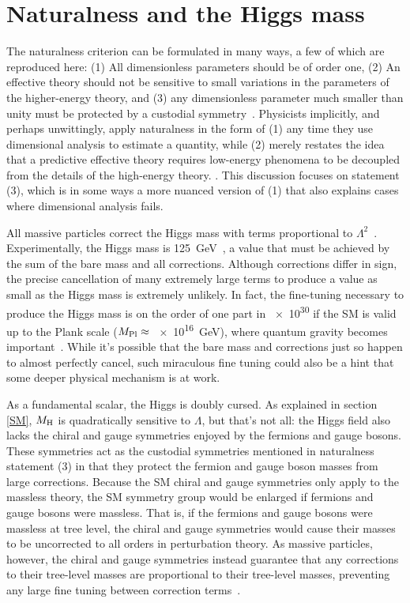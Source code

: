 \documentclass[12pt]{article}
\begin{document}
\section{Naturalness and the Higgs mass}
    The naturalness criterion can be formulated in many ways, a few of which are reproduced here: (1) All dimensionless parameters should be of order one, (2) An effective theory should not be sensitive to small variations in the parameters of the higher-energy theory, and (3) any dimensionless parameter much smaller than unity must be protected by a custodial symmetry~\cite{giudice_naturally, thooft_naturalness}. Physicists implicitly, and perhaps unwittingly, apply naturalness in the form of (1) any time they use dimensional analysis to estimate a quantity, while (2) merely restates the idea that a predictive effective theory requires low-energy phenomena to be decoupled from the details of the high-energy theory. . This discussion focuses on statement (3), which is in some ways a more nuanced version of (1) that also explains cases where dimensional analysis fails.

    All massive particles correct the Higgs mass with terms proportional to $\Lambda^2$~\cite{dine_naturalness}. Experimentally, the Higgs mass is \SI{125}{\giga\electronvolt}~\cite{cms_higgs, atlas_higgs}, a value that must be achieved by the sum of the bare mass and all corrections. Although corrections differ in sign, the precise cancellation of many extremely large terms to produce a value as small as the Higgs mass is extremely unlikely. In fact, the fine-tuning necessary to produce the Higgs mass is on the order of one part in \num{e30} if the SM is valid up to the Plank scale ($M_{\mathrm{Pl}}\approx$ \SI{e16}{\giga\electronvolt}), where quantum gravity becomes important~\cite{giudice_naturally}. While it's possible that the bare mass and corrections just so happen to almost perfectly cancel, such miraculous fine tuning could also be a hint that some deeper physical mechanism is at work.
    
    As a fundamental scalar, the Higgs is doubly cursed. As explained in section \ref{SM}, $M_{\mathrm{H}}$ is quadratically sensitive to $\Lambda$, but that's not all: the Higgs field also lacks the chiral and gauge symmetries enjoyed by the fermions and gauge bosons. These symmetries act as the custodial symmetries mentioned in naturalness statement (3) in that they protect the fermion and gauge boson masses from large corrections. Because the SM chiral and gauge symmetries only apply to the massless theory, the SM symmetry group would be enlarged if fermions and gauge bosons were massless. That is, if the fermions and gauge bosons were massless at tree level, the chiral and gauge symmetries would cause their masses to be uncorrected to all orders in perturbation theory. As massive particles, however, the chiral and gauge symmetries instead guarantee that any corrections to their tree-level masses are proportional to their tree-level masses, preventing any large fine tuning between correction terms~\cite{giudice_naturally}.  
\end{document}
